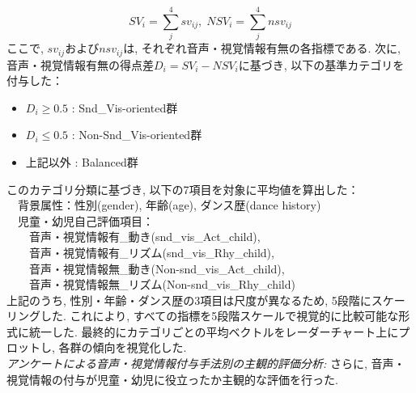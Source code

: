\documentclass[paper]{ieicej}
\begin{document}
\begin{equation}
  SV_{i}=\sum_{j}^{4}sv_{ij},\; NSV_{i}=\sum_{j}^{4}nsv_{ij}
\end{equation}
ここで, $sv_{ij}$および$nsv_{ij}$は, それぞれ音声・視覚情報有無の各指標である. 次に, 音声・視覚情報有無の得点差$D_{i}=SV_{i}-NSV_{i}$に基づき, 以下の基準カテゴリを付与した：
\begin{itemize}[nosep]
  \item $D_{i} \geq 0.5$ : Snd\_Vis-oriented群
  \item $D_{i} \leq 0.5$ : Non-Snd\_Vis-oriented群
  \item 上記以外 : Balanced群
\end{itemize}
このカテゴリ分類に基づき, 以下の7項目を対象に平均値を算出した：\\
　背景属性：性別(gender), 年齢(age), ダンス歴(dance history)\\
　児童・幼児自己評価項目：\\
　　音声・視覚情報有\_動き(snd\_vis\_Act\_child),\\
　　音声・視覚情報有\_リズム(snd\_vis\_Rhy\_child),\\
　　音声・視覚情報無\_動き(Non-snd\_vis\_Act\_child),\\
　　音声・視覚情報無\_リズム(Non-snd\_vis\_Rhy\_child) \\
上記のうち, 性別・年齢・ダンス歴の3項目は尺度が異なるため, 5段階にスケーリングした. これにより, すべての指標を5段階スケールで視覚的に比較可能な形式に統一した. 最終的にカテゴリごとの平均ベクトルをレーダーチャート上にプロットし, 各群の傾向を視覚化した. \\
\emph{アンケートによる音声・視覚情報付与手法別の主観的評価分析: }さらに, 音声・視覚情報の付与が児童・幼児に役立ったか主観的な評価を行った. 
\end{document}
